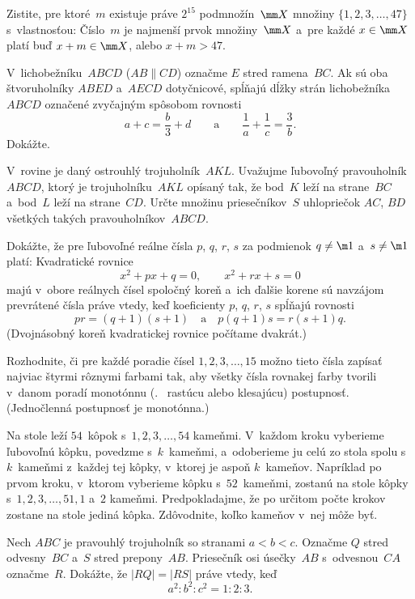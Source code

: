 {%
Zistite, pre ktoré~$m$ existuje práve $2^{15}$ podmnožín~$\mm X$
množiny $\{1,2,3,\dots,47\}$ s~vlastnosťou: Číslo~$m$ je najmenší
prvok množiny~$\mm X$ a~pre každé $x\in\mm X$ platí buď $x+m\in\mm X$,
alebo $x+m>47$.}

{%
V~lichobežníku~$ABCD$ ($AB\parallel CD$) označme $E$ stred ramena~$BC$.
Ak sú oba štvoruholníky $ABED$ a~$AECD$ dotyčnicové, spĺňajú
dĺžky strán lichobežníka $ABCD$ označené zvyčajným spôsobom rovnosti
$$
a+c=\frac{b}{3}+d\qquad\text{a}\qquad \frac{1}{a}+\frac{1}{c}=
\frac{3}{b}.
$$
Dokážte.}

{%
V~rovine je daný ostrouhlý trojuholník~$AKL$. Uvažujme ľubovoľný
pravouholník $ABCD$, ktorý je trojuholníku~$AKL$ opísaný tak, že bod~$K$
leží na strane~$BC$ a~bod~$L$ leží na strane~$CD$. Určte množinu
priesečníkov~$S$ uhlopriečok $AC$, $BD$ všetkých takých pravouholníkov~$ABCD$.}

{%
Dokážte, že pre ľubovoľné reálne čísla $p$, $q$, $r$, $s$ za
podmienok $q\ne\m1$ a~$s\ne\m1$ platí: Kvadratické rovnice
$$
x^2+px+q=0,\qquad x^2+rx+s=0
$$
majú v~obore reálnych čísel spoločný koreň a~ich ďalšie korene
sú navzájom prevrátené čísla práve vtedy, keď koeficienty
$p$, $q$, $r$, $s$ spĺňajú rovnosti
$$
pr=(q+1)(s+1)        \quad\text{a}\quad
p(q+1)s=r(s+1)q.
$$
(Dvojnásobný koreň kvadratickej rovnice počítame dvakrát.)}

{%
Rozhodnite, či pre každé poradie čísel $1, 2, 3, \dots, 15$
možno tieto čísla zapísať najviac štyrmi rôznymi farbami tak, aby
všetky čísla rovnakej farby tvorili v~danom poradí monotónnu
(\tj.~ rastúcu alebo klesajúcu) postupnosť.
(Jednočlenná postupnosť je monotónna.)}

{%
Na stole leží $54$~kôpok s~$1, 2, 3, \dots, 54$ kameňmi.
V~každom kroku vyberieme ľubovoľnú kôpku, povedzme s~$k$~kameňmi,
a~odoberieme ju celú zo stola spolu
s~$k$~kameňmi z~každej tej kôpky, v~ktorej je aspoň $k$~kameňov.
Napríklad po prvom kroku, v~ktorom vyberieme  kôpku s~$52$~kameňmi,
zostanú na stole kôpky s~$1, 2, 3, \dots, 51, 1$ a~$2$ kameňmi.
Predpokladajme, že po určitom počte krokov zostane na
stole jediná kôpka. Zdôvodnite, koľko kameňov v~nej môže byť.}

{%
Nech $ABC$ je pravouhlý trojuholník so stranami $a<b<c$. Označme
$Q$ stred odvesny~$BC$ a~$S$ stred prepony~$AB$. Priesečník osi
úsečky~$AB$ s~odvesnou~$CA$ označme~$R$. Dokážte, že $|RQ|=|RS|$ práve vtedy, keď
$$
a^2:b^2:c^2=1:2:3.
$$}

